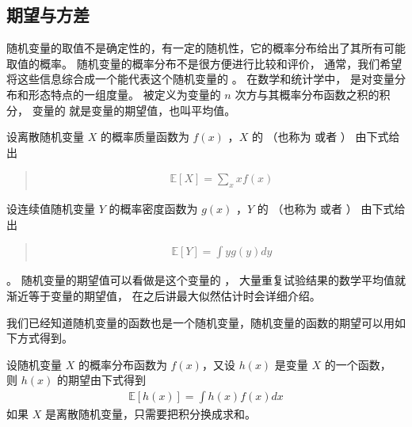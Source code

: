 \documentclass[letterpaper,10pt,english]{sphinxmanual}
\begin{document}
\subsection{期望与方差}
\label{\detokenize{_u6982_u7387_u57fa_u7840/content:id15}}
随机变量的取值不是确定性的，有一定的随机性，它的概率分布给出了其所有可能取值的概率。
随机变量的概率分布不是很方便进行比较和评价，
通常，我们希望将这些信息综合成一个能代表这个随机变量的  。
在数学和统计学中， 是对变量分布和形态特点的一组度量。
 被定义为变量的 \(n\) 次方与其概率分布函数之积的积分，
变量的  就是变量的期望值，也叫平均值。

\begin{sphinxShadowBox}

设离散随机变量 \(X\) 的概率质量函数为 \(f(x)\) ，\(X\) 的  （也称为  或者  ）
由下式给出
\begin{quote}
\begin{equation}\label{equation:概率基础/content:概率基础/content:40}
\begin{split}\mathbb{E}[X] = \sum_x x f(x)\end{split}
\end{equation}\end{quote}

设连续值随机变量 \(Y\) 的概率密度函数为 \(g(x)\) ，\(Y\) 的  （也称为  或者  ）
由下式给出
\begin{quote}
\begin{equation}\label{equation:概率基础/content:概率基础/content:41}
\begin{split}\mathbb{E}[Y] = \int y g(y) d y\end{split}
\end{equation}\end{quote}
\end{sphinxShadowBox}

。
随机变量的期望值可以看做是这个变量的  ，
大量重复试验结果的数学平均值就渐近等于变量的期望值，
在之后讲最大似然估计时会详细介绍。

我们已经知道随机变量的函数也是一个随机变量，随机变量的函数的期望可以用如下方式得到。

\begin{sphinxShadowBox}

设随机变量 \(X\) 的概率分布函数为 \(f(x)\)，又设 \(h(x)\) 是变量 \(X\) 的一个函数，
则 \(h(x)\) 的期望由下式得到
\begin{equation}\label{equation:概率基础/content:概率基础/content:42}
\begin{split}\mathbb{E}[h(x)] = \int h(x) f(x) dx\end{split}
\end{equation}
如果 \(X\) 是离散随机变量，只需要把积分换成求和。
\end{sphinxShadowBox}
\end{document}
